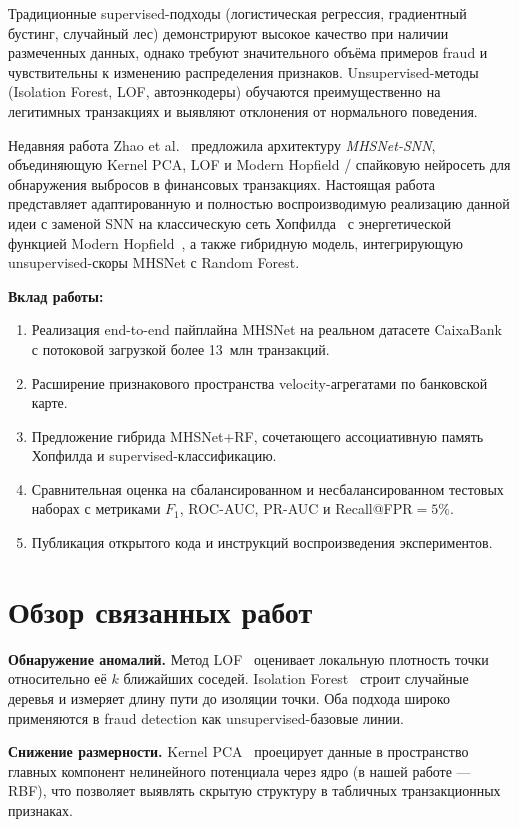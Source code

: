 \documentclass[12pt,a4paper]{article}
\begin{document}
Традиционные supervised-подходы (логистическая регрессия, градиентный бустинг, случайный лес)
демонстрируют высокое качество при наличии размеченных данных, однако требуют значительного объёма
примеров fraud и чувствительны к изменению распределения признаков.
Unsupervised-методы (Isolation Forest, LOF, автоэнкодеры) обучаются преимущественно на легитимных
транзакциях и выявляют отклонения от нормального поведения.

Недавняя работа Zhao et al.~\cite{zhao2025mhsnet} предложила архитектуру \textit{MHSNet-SNN},
объединяющую Kernel PCA, LOF и Modern Hopfield / спайковую нейросеть для обнаружения выбросов
в финансовых транзакциях. Настоящая работа представляет адаптированную и полностью воспроизводимую
реализацию данной идеи с заменой SNN на классическую сеть Хопфилда~\cite{hopfield1982}
с энергетической функцией Modern Hopfield~\cite{ramsbauer2021}, а также гибридную модель,
интегрирующую unsupervised-скоры MHSNet с Random Forest.

\textbf{Вклад работы:}
\begin{enumerate}
  \item Реализация end-to-end пайплайна MHSNet на реальном датасете CaixaBank~\cite{computingvictor2024}
        с потоковой загрузкой более 13~млн транзакций.
  \item Расширение признакового пространства velocity-агрегатами по банковской карте.
  \item Предложение гибрида MHSNet+RF, сочетающего ассоциативную память Хопфилда и supervised-классификацию.
  \item Сравнительная оценка на сбалансированном и несбалансированном тестовых наборах
        с метриками $F_1$, ROC-AUC, PR-AUC и Recall@FPR$=5\%$.
  \item Публикация открытого кода и инструкций воспроизведения экспериментов.
\end{enumerate}

\section{Обзор связанных работ}
\label{sec:related}

\textbf{Обнаружение аномалий.}
Метод LOF~\cite{breunig2000} оценивает локальную плотность точки относительно её $k$ ближайших соседей.
Isolation Forest~\cite{liu2008} строит случайные деревья и измеряет длину пути до изоляции точки.
Оба подхода широко применяются в fraud detection как unsupervised-базовые линии.

\textbf{Снижение размерности.}
Kernel PCA~\cite{scholkopf1998} проецирует данные в пространство главных компонент нелинейного
потенциала через ядро (в нашей работе --- RBF), что позволяет выявлять скрытую структуру
в табличных транзакционных признаках.
\end{document}
